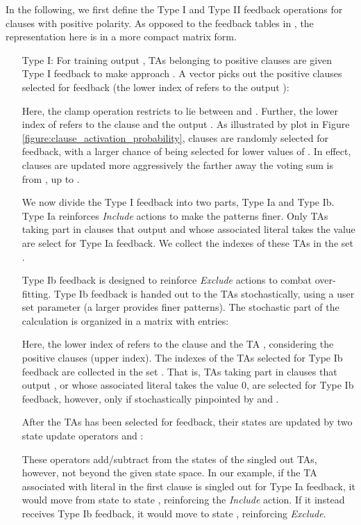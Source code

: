 \documentclass{article}
\begin{document}
In the following, we first define the Type I and Type II feedback operations for clauses with positive polarity. As opposed to the feedback tables in \cite{granmo2018tsetlin}, the representation here is in a more compact matrix form.
\begin{itemize}
\item[Type I:] For training output , TAs belonging to positive clauses are given Type I feedback to make  approach . A vector  picks out the positive clauses selected for feedback (the lower index of  refers to the output ):

Here, the clamp operation restricts  to lie between  and . Further, the lower index of  refers to the clause  and the output . As illustrated by plot  in Figure \ref{figure:clause_activation_probability}, clauses are randomly selected for feedback, with a larger chance of being selected for lower values of . In effect, clauses are updated more aggressively the farther away the voting sum is from , up to .

We now divide the Type I feedback into two parts, Type Ia and Type Ib. Type Ia reinforces \emph{Include} actions to make the patterns finer. Only TAs taking part in clauses that output  and whose associated literal takes the value  are select for Type Ia feedback. We collect the indexes of these TAs in the set .

Type Ib feedback is designed to reinforce \emph{Exclude} actions to combat over-fitting. Type Ib feedback is handed out to the TAs stochastically, using a user set parameter  (a larger  provides finer patterns). The stochastic part of the calculation is organized in a matrix  with entries:

Here, the lower index of  refers to the clause  and the TA , considering the positive clauses (upper index). The indexes of the TAs selected for Type Ib feedback are collected in the set .
That is, TAs taking part in clauses that output , or whose associated literal takes the value 0, are selected for Type Ib feedback, however, only if stochastically pinpointed by  and . 

After the TAs has been selected for feedback, their states are updated by two state update operators  and :

These operators add/subtract  from the states of the singled out TAs, however, not beyond the given state space. In our example, if the TA associated with literal  in the first clause is singled out for Type Ia feedback, it would move from state  to state , reinforcing the \emph{Include} action. If it instead receives Type Ib feedback, it would move to state , reinforcing \emph{Exclude}. 


\end{itemize}
\end{document}
